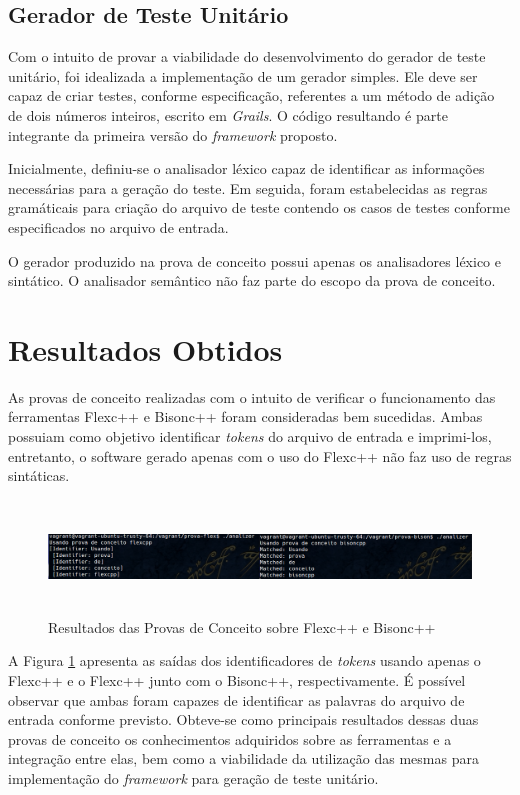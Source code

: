 \subsection{Gerador de Teste Unitário}
Com o intuito de provar a viabilidade do desenvolvimento do gerador de teste unitário, foi idealizada a implementação de um gerador simples. Ele deve ser capaz de criar testes, conforme especificação, referentes a um método de adição de dois números inteiros, escrito em \textit{Grails}. O código resultando é parte integrante da primeira versão do \textit{framework} proposto. 
\par 
\indent Inicialmente, definiu-se o analisador léxico capaz de identificar as informações necessárias para a geração do teste. Em seguida, foram estabelecidas as regras gramáticais para criação do arquivo de teste contendo os casos de testes conforme especificados no arquivo de entrada.
\par 
\indent O gerador produzido na prova de conceito possui apenas os analisadores léxico e sintático. O analisador semântico não faz parte do escopo da prova de conceito.

\section{Resultados Obtidos}
As provas de conceito realizadas com o intuito de verificar o funcionamento das ferramentas Flexc++ e Bisonc++ foram consideradas bem sucedidas. Ambas possuiam como objetivo identificar \textit{tokens} do arquivo de entrada e imprimi-los, entretanto, o software gerado apenas com o uso do Flexc++ não faz uso de regras sintáticas. 

 \begin{figure}[h]
    \centering
    \includegraphics[width=\textwidth,height=3cm]{figuras/resultadosPCBF.png}
    \caption{Resultados das Provas de Conceito sobre Flexc++ e Bisonc++}
    \label{fig:resultadosPCBF}
 \end{figure}

\par
\indent A Figura \ref{fig:resultadosPCBF} apresenta as saídas dos identificadores de \textit{tokens} usando apenas o Flexc++ e o Flexc++ junto com o Bisonc++, respectivamente. É possível observar que ambas foram capazes de identificar as palavras do arquivo de entrada conforme previsto. Obteve-se como principais resultados dessas duas provas de conceito os conhecimentos adquiridos sobre as ferramentas e a integração entre elas, bem como a viabilidade da utilização das mesmas para implementação do \textit{framework} para geração de teste unitário.


